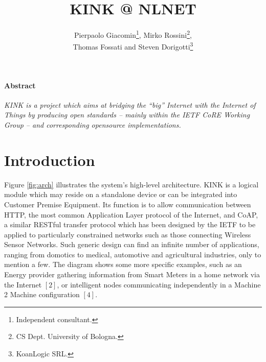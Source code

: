 \documentclass[12pt]{article}
\title{KINK @ NLNET}
\author{Pierpaolo Giacomin\footnote{Independent consultant.}, Mirko Rossini\footnote{CS Dept. University of Bologna.},\\Thomas Fossati and Steven Dorigotti\footnote{KoanLogic SRL.}}
\begin{document}
\maketitle
\tableofcontents
\newpage

\paragraph{Abstract}
\emph{KINK is a project which aims at bridging the ``big'' Internet with the Internet of Things by producing open standards -- mainly within the IETF CoRE Working Group -- and corresponding \mbox{opensource} implementations.}\\

\section{Introduction}
\label{sec:intro}

Figure \ref{fig:arch} illustrates the system's high-level architecture. KINK is a logical module which may reside on a standalone device or can be integrated into Customer Premise Equipment. Its function is to allow communication between HTTP, the most common Application Layer protocol of the Internet, and CoAP, a similar RESTful transfer protocol which has been designed by the IETF to be applied to particularly constrained networks such as those connecting Wireless Sensor Networks. Such generic design can find an infinite number of applications, ranging from domotics to medical, automotive and agricultural industries, only to mention a few. The diagram shows some more specific examples, such as an Energy provider gathering information from Smart Meters in a home network via the Internet $[2]$, or intelligent nodes communicating independently in a Machine 2 Machine configuration $[4]$.
\end{document}
